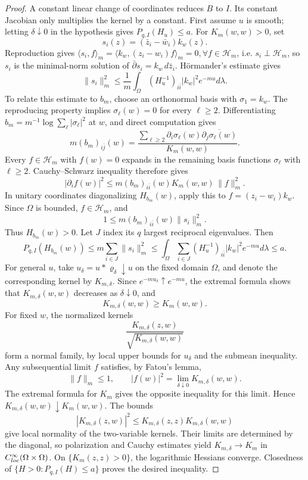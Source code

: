 \documentclass[10pt,a4paper]{amsart}
\begin{document}
\begin{proof}
A constant linear change of coordinates reduces $B$ to $I$. Its constant Jacobian only multiplies the kernel by a constant. First assume $u$ is smooth; letting $\delta\downarrow0$ in the
hypothesis gives $P_{q,I}(H_u)\leq a$.  For $K_m(w,w)>0$, set
\[
 s_i(z)=(\bar z_i-\bar w_i)k_w(z).
\]
Reproduction gives $\langle s_i,f\rangle_m
=\langle k_w,(z_i-w_i)f\rangle_m=0, \forall f\in\mathscr H_m$, i.e. $s_i\perp\mathscr H_m$, so $s_i$ is the minimal-norm solution of $\bar\partial s_i=k_w\,d\bar z_i$. H\"ormander's estimate gives
\begin{equation}
 \|s_i\|_m^2\le\frac1m\int_\Omega(H_u^{-1})_{i\bar i}|k_w|^2e^{-mu}d\lambda.
\end{equation}
To relate this estimate to $b_m$, choose an orthonormal basis
with $\sigma_1=k_w$. The reproducing property implies
$\sigma_\ell(w)=0$ for every $\ell\ge2$.
Differentiating $b_m=m^{-1}\log\sum_\ell|\sigma_\ell|^2$ at
$w$, and direct computation gives 
\begin{equation}
 m(b_m)_{i\bar j}(w)=
 \frac{\sum_{\ell\ge2}\partial_i\sigma_\ell(w)\overline{\partial_j\sigma_\ell(w)}}{K_m(w,w)}.
\end{equation}
Every $f\in\mathscr H_m$ with $f(w)=0$ expands in the
remaining basis functions $\sigma_\ell$ with $\ell\ge 2$. Cauchy--Schwarz inequality therefore gives
\[
|\partial_i f(w)|^2
\le m(b_m)_{i\bar i}(w)K_m(w,w)\,\|f\|_m^2.
\]
In unitary coordinates diagonalizing $H_{b_m}(w)$, apply this to $f=(z_i-w_i)k_w$. Since $\Omega$ is bounded, $f\in\mathscr H_m$, and
\[
 1\le m(b_m)_{i\bar i}(w)\|s_i\|_m^2.
\]
Thus $H_{b_m}(w)>0$. Let $J$ index its $q$ largest reciprocal eigenvalues. Then
\[
 P_{q,I}(H_{b_m}(w))
 \le m\sum_{i\in J}\|s_i\|_m^2
 \le\int_\Omega\sum_{i\in J}(H_u^{-1})_{i\bar i}|k_w|^2e^{-mu}d\lambda\le a.
\]
For general $u$, take $u_\delta=u*\varrho_\delta\downarrow u$
on the fixed domain $\Omega$, and denote the corresponding
kernel by $K_{m,\delta}$.
Since $e^{-mu_\delta}\uparrow e^{-mu}$, the extremal formula
shows that $K_{m,\delta}(w,w)$ decreases as
$\delta\downarrow0$, and
\[
K_{m,\delta}(w,w)\ge K_m(w,w).
\]
For fixed $w$, the normalized kernels
\[
\frac{K_{m,\delta}(z,w)}{\sqrt{K_{m,\delta}(w,w)}}
\]
form a normal family, by local upper bounds for $u_\delta$
and the submean inequality. Any subsequential limit $f$
satisfies, by Fatou's lemma,
\[
\|f\|_m\le1,\qquad
|f(w)|^2=\lim_{\delta\downarrow0}K_{m,\delta}(w,w).
\]
The extremal formula for $K_m$ gives the opposite inequality
for this limit. Hence $K_{m,\delta}(w,w)\downarrow K_m(w,w)$.
The bounds
\[
|K_{m,\delta}(z,w)|^2
\le K_{m,\delta}(z,z)K_{m,\delta}(w,w)
\]
give local normality of the two-variable kernels.
Their limits are determined by the diagonal, so polarization and
Cauchy estimates yield $K_{m,\delta}\to K_m$ in
$C^\infty_{\rm loc}(\Omega\times\Omega)$.
On $\{K_m(z,z)>0\}$, the logarithmic Hessians converge.
Closedness of $\{H>0:P_{q,I}(H)\le a\}$ proves the desired inequality.


\end{proof}
\end{document}
